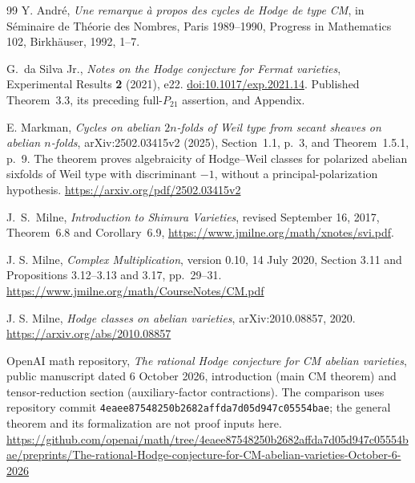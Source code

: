 \begin{thebibliography}{99}
Y. Andr\'e,
\emph{Une remarque \`a propos des cycles de Hodge de type CM},
in S\'eminaire de Th\'eorie des Nombres, Paris 1989--1990, Progress in Mathematics 102, Birkh\"auser, 1992, 1--7.

G.~da Silva Jr., \emph{Notes on the Hodge conjecture for Fermat varieties},
Experimental Results \textbf{2} (2021), e22.
\href{https://doi.org/10.1017/exp.2021.14}{doi:10.1017/exp.2021.14}.
Published Theorem~3.3, its preceding full-$P_{21}$ assertion, and Appendix.


E. Markman,
\emph{Cycles on abelian $2n$-folds of Weil type from secant sheaves on abelian $n$-folds},
arXiv:2502.03415v2 (2025), Section~1.1, p.~3, and Theorem~1.5.1, p.~9.
The theorem proves algebraicity of Hodge--Weil classes for polarized
abelian sixfolds of Weil type with discriminant $-1$, without a
principal-polarization hypothesis.
\url{https://arxiv.org/pdf/2502.03415v2}

J.~S.~Milne, \emph{Introduction to Shimura Varieties},
revised September 16, 2017, Theorem~6.8 and Corollary~6.9,
\url{https://www.jmilne.org/math/xnotes/svi.pdf}.

J. S. Milne,
\emph{Complex Multiplication}, version 0.10, 14 July 2020,
Section 3.11 and Propositions 3.12--3.13 and 3.17, pp.~29--31.
\url{https://www.jmilne.org/math/CourseNotes/CM.pdf}

J. S. Milne,
\emph{Hodge classes on abelian varieties},
arXiv:2010.08857, 2020.
\url{https://arxiv.org/abs/2010.08857}

OpenAI math repository,
\emph{The rational Hodge conjecture for CM abelian varieties},
public manuscript dated 6 October 2026, introduction (main CM theorem)
and tensor-reduction section (auxiliary-factor contractions).
The comparison uses repository commit
\texttt{4eaee87548250b2682affda7d05d947c05554bae};
the general theorem and its formalization are not proof inputs here.
\url{https://github.com/openai/math/tree/4eaee87548250b2682affda7d05d947c05554bae/preprints/The-rational-Hodge-conjecture-for-CM-abelian-varieties-October-6-2026}


\end{thebibliography}
